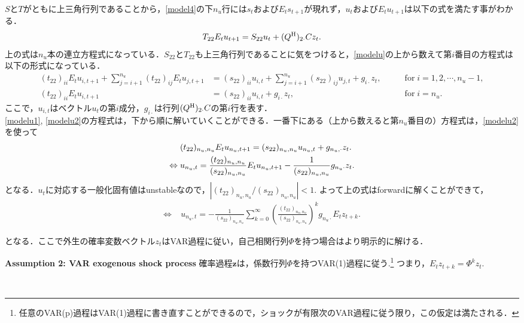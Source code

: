 \documentclass[a4j, dvipdfmx]{jarticle}
\begin{document}
$S$と$T$がともに上三角行列であることから，\eqref{model4}の下$n_u$行には$s_t$および$E_ts_{t+1}$が現れず，$u_t$および$E_tu_{t+1}$は以下の式を満たす事がわかる．
\begin{align}
T_{22}E_tu_{t+1} = S_{22}u_t + (Q^{\rm{H}})_{2\cdot}Cz_t. \label{modelu}
\end{align}
上の式は$n_u$本の連立方程式になっている．$S_{22}$と$T_{22}$も上三角行列であることに気をつけると，\eqref{modelu}の上から数えて第$i$番目の方程式は以下の形式になっている．
\begin{align}
(t_{22})_{ii}E_tu_{i,t+1} + \sum_{j=i+1}^{n_u}(t_{22})_{ij}E_tu_{j,t+1} &= (s_{22})_{ii}u_{i,t} + \sum_{j=i+1}^{n_u}(s_{22})_{ij}u_{j,t} + g_{i\cdot}z_t, \qquad &\text{for} \; i = 1,2,\cdots, n_u-1,\label{modelu1}\\
(t_{22})_{ii}E_tu_{i,t+1} &= (s_{22})_{ii}u_{i,t} + g_{i\cdot}z_t, & \text{for} \; i=n_u. \label{modelu2}
\end{align}
ここで，$u_{i,t}$はベクトル$u_t$の第$i$成分，$g_{i\cdot}$は行列$(Q^{\rm{H}})_{2\cdot}C$の第$i$行を表す．\\

\eqref{modelu1}, \eqref{modelu2}の方程式は，下から順に解いていくことができる．一番下にある（上から数えると第$n_u$番目の）方程式は，\eqref{modelu2}を使って
\begin{align}
&(t_{22})_{n_u,n_u} E_tu_{n_u,t+1} = (s_{22})_{n_u,n_u}u_{n_u,t} + g_{n_u,\cdot}z_t.\notag\\
\Leftrightarrow \; &u_{n_u,t} = \frac{(t_{22})_{n_u,n_u}}{(s_{22})_{n_u,n_u}}E_tu_{n_u,t+1} - \frac{1}{(s_{22})_{n_u,n_u}}g_{n_u\cdot}z_t.\notag
\end{align}
となる．$u_t$に対応する一般化固有値はunstableなので，$|(t_{22})_{n_u,n_u}/(s_{22})_{n_u,n_u}|<1$. よって上の式はforwardに解くことができて，
\begin{align}
\Leftrightarrow \; &u_{n_u,t} = - \frac{1}{(s_{22})_{n_u,n_u}} \sum_{k = 0}^\infty \left(\frac{(t_{22})_{n_u,n_u}}{(s_{22})_{n_u,n_u}}\right)^k g_{n_u\cdot}E_tz_{t+k}.\label{modelu3}
\end{align}


となる．ここで外生の確率変数ベクトル$z_t$はVAR過程に従い，自己相関行列$\Phi$を持つ場合はより明示的に解ける．\\

\begin{itembox}[l]{{\bf Assumption 2: VAR exogenous shock process}}
確率過程$\boldsymbol{z}$は，係数行列$\Phi$を持つVAR(1)過程に従う.\footnote{任意のVAR(p)過程はVAR(1)過程に書き直すことができるので，ショックが有限次のVAR過程に従う限り，この仮定は満たされる．} つまり，$E_tz_{t+k} = \Phi^kz_t$.
\end{itembox}
\\
\end{document}
